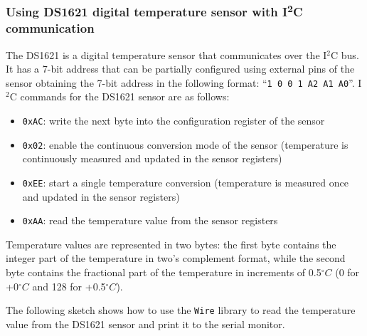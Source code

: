 \subsubsection*{Using DS1621 digital temperature sensor with I\texorpdfstring{\textsuperscript{2}}{2}C communication}
The DS1621 is a digital temperature sensor that communicates over the I\(^2\)C bus. It has a 7-bit address that can be partially
configured using external pins of the sensor obtaining the 7-bit address in the following format: ``\texttt{1 0 0 1 A2 A1 A0}''.
I\(^2\)C commands for the DS1621 sensor are as follows:
\begin{itemize}
	\item \texttt{0xAC}: write the next byte into the configuration register of the sensor
	\item \texttt{0x02}: enable the continuous conversion mode of the sensor (temperature is continuously measured and updated in the sensor registers)
	\item \texttt{0xEE}: start a single temperature conversion (temperature is measured once and updated in the sensor registers)
	\item \texttt{0xAA}: read the temperature value from the sensor registers
\end{itemize}

Temperature values are represented in two bytes: the first byte contains the integer part of the temperature in two's complement
format, while the second byte contains the fractional part of the temperature in increments of 0.5\(^\circ C\) (0 for +0\(^\circ C\)
and 128 for +0.5\(^\circ C\)).

The following sketch shows how to use the \texttt{Wire} library to read the temperature value from the DS1621 sensor and print
it to the serial monitor.

